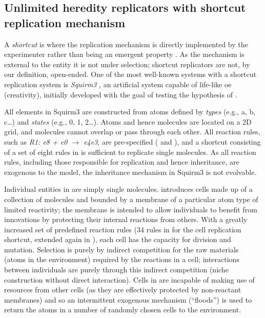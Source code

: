 \subsection{Unlimited heredity replicators with shortcut replication mechanism}

A \emph{shortcut} is where the replication mechanism is directly implemented by the experimenter rather than being an emergent property \parencite{BanzhafBaumgaertnerBeslonEtAl2016}. As the mechanism is external to the entity it is not under selection; shortcut replicators are not, by our definition, open-ended. One of the most well-known systems with a shortcut replication system is \emph{Squirm3} \parencite{Hutton2007,Hutton2002}, an artificial system capable of life-like \gls{oe} (creativity), initially developed with the goal of testing the hypothesis of \textcite{Taylor2001} \parencite[p.341]{Hutton2002}.

All elements in Squirm3 are constructed from atoms defined by \emph{types} (e.g., a, b, c\dots) and \emph{states} (e.g., 0, 1, 2\dots). Atoms and hence molecules are located on a 2D grid, and molecules cannot overlap or pass through each other. All reaction rules, such as \emph{R1: e8 + e0 $\rightarrow$ e4e3}, are pre-specified (\textcite[p.4]{Hutton2007} and \textcite[p.49]{Faulconbridge2011}), and a shortcut consisting of a set of eight rules in \textcite{Hutton2002} is sufficient to replicate single molecules. As all reaction rules, including those responsible for replication and hence inheritance, are exogenous to the model, the inheritance mechanism in Squirm3 is not evolvable. 

Individual entities in \textcite{Hutton2002} are simply single molecules. \Textcite{Hutton2007} introduces cells made up of a collection of molecules and bounded by a membrane of a particular atom type of limited reactivity; the membrane is intended to allow individuals to benefit from innovations by protecting their internal reactions from others. With a greatly increased set of predefined reaction rules (34 rules in \textcite{Hutton2007} for the cell replication shortcut, extended again in \textcite{Lucht2012}), each cell has the capacity for division and mutation.  Selection is purely by indirect competition for the raw materials (atoms in the environment) required by the reactions in a cell; interactions between individuals are purely through this indirect competition (niche construction without direct interaction). Cells in \textcite{Hutton2007} are incapable of making use of resources from other cells (as they are effectively protected by non-reactant membranes) and so an intermittent exogenous mechanism (``floods'') is used to return the atoms in a number of randomly chosen cells to the environment.

